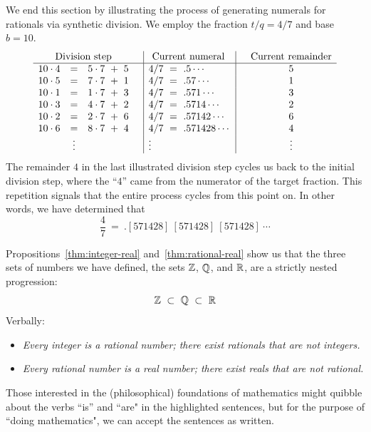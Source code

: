 \medskip

We end this section by illustrating the process of generating numerals for rationals via synthetic division.  We employ the fraction $t/q = 4/7$ and base $b = 10$.
\[
\begin{array}{lclc|l|cc}
\multicolumn{3}{c}{\mbox{Division step}} & &  \hspace*{.05in} \mbox{Current numeral} & &
\mbox{Current remainder} \\
\hline
10 \cdot 4   & = & 5 \cdot 7 \ + \ 5 &
      & 4/7 \ = \ .5 \cdots &
      & 5 \\
10 \cdot 5 & = & 7 \cdot 7 \ + \ 1 &
      & 4/7 \ = \ .57 \cdots &
      & 1 \\
10 \cdot 1 & = & 1 \cdot 7 \ + \ 3 &
      & 4/7 \ = \ .571 \cdots &
      & 3 \\
10 \cdot 3 & = & 4 \cdot 7 \ + \ 2 &
      & 4/7 \ = \ .5714 \cdots &
      & 2 \\
10 \cdot 2 & = & 2 \cdot 7 \ + \ 6 &
      & 4/7 \ = \ .57142 \cdots &
      & 6 \\
10 \cdot 6 & = & 8 \cdot 7 \ + \ 4 &
      & 4/7 \ = \ .571428 \cdots &
      & 4 \\
 & \vdots & & & \vdots & & \vdots
\end{array}
\]
The remainder $4$ in the last illustrated division step cycles us back to the initial division step, where the ``$4$'' came from the numerator of the target fraction.  This repetition signals that the
entire process cycles from this point on.  In other words, we have determined that
\[ \frac{4}{7} \ = \ .[571428] \ [571428] \ [571428] \ \cdots \]

\bigskip

Propositions~\ref{thm:integer-real} and~\ref{thm:rational-real} show us that the three sets of numbers we have defined, the sets $\mathbb{Z}$, $\mathbb{Q}$, and $\mathbb{R}$, are a strictly nested progression:
\[ \Z \ \subset \ \Q \ \subset \ \R \]
Verbally:
\begin{itemize}
\item
{\em Every integer is a rational number; there exist rationals that are not integers.}
\medskip\item
{\em Every rational number is a real number; there exist reals that are not rational.} 
\end{itemize}

Those interested in the (philosophical) foundations of mathematics might quibble about the verbs ``is'' and ``are" in the highlighted sentences, but for the purpose of ``doing mathematics", we can accept the sentences as written.

